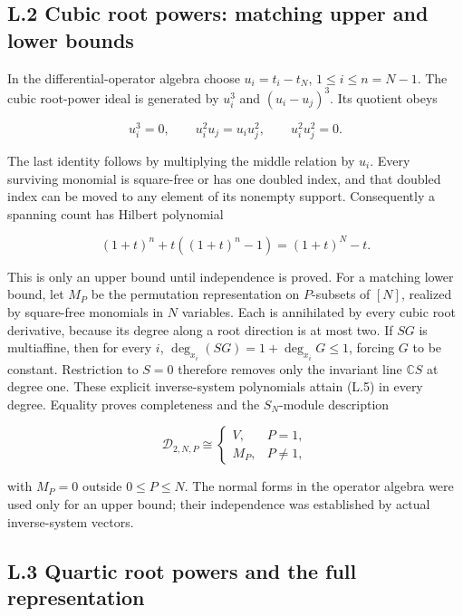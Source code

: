 \documentclass[a4paper,11pt]{article}
\numberwithin{equation}{section}
\begin{document}
\hypertarget{l.2-cubic-root-powers-matching-upper-and-lower-bounds}{%
\subsection{L.2 Cubic root powers: matching upper and lower bounds}\label{l.2-cubic-root-powers-matching-upper-and-lower-bounds}}

In the differential-operator algebra choose \(u_i=t_i-t_N\), \(1\le i\le n=N-1\). The cubic root-power ideal is generated by \(u_i^3\) and \((u_i-u_j)^3\). Its quotient obeys

\[
u_i^3=0,\qquad u_i^2u_j=u_iu_j^2,\qquad u_i^2u_j^2=0.
\tag{L.4}
\]

The last identity follows by multiplying the middle relation by \(u_i\). Every surviving monomial is square-free or has one doubled index, and that doubled index can be moved to any element of its nonempty support. Consequently a spanning count has Hilbert polynomial

\[
(1+t)^n+t((1+t)^n-1)=(1+t)^N-t.
\tag{L.5}
\]

This is only an upper bound until independence is proved. For a matching lower bound, let \(M_P\) be the permutation representation on \(P\)-subsets of \([N]\), realized by square-free monomials in \(N\) variables. Each is annihilated by every cubic root derivative, because its degree along a root direction is at most two. If \(SG\) is multiaffine, then for every \(i\), \(\deg_{x_i}(SG)=1+\deg_{x_i}G\le1\), forcing \(G\) to be constant. Restriction to \(S=0\) therefore removes only the invariant line \(\mathbb C S\) at degree one. These explicit inverse-system polynomials attain (L.5) in every degree. Equality proves completeness and the \(S_N\)-module description

\[
\mathscr D_{2,N,P}\cong
\begin{cases}V,&P=1,\\M_P,&P\ne1,\end{cases}
\tag{L.6}
\]

with \(M_P=0\) outside \(0\le P\le N\). The normal forms in the operator algebra were used only for an upper bound; their independence was established by actual inverse-system vectors.

\hypertarget{l.3-quartic-root-powers-and-the-full-representation}{%
\subsection{L.3 Quartic root powers and the full representation}\label{l.3-quartic-root-powers-and-the-full-representation}}
\end{document}
